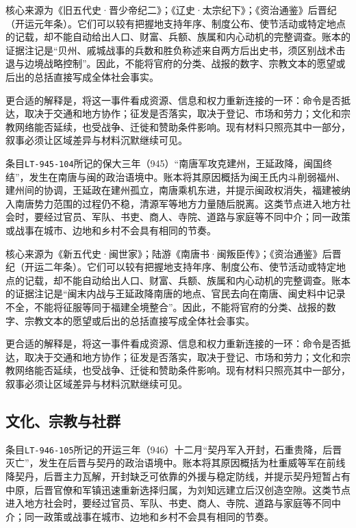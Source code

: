核心来源为《旧五代史·晋少帝纪二》；《辽史·太宗纪下》；《资治通鉴》后晋纪（开运元年条）。它们可以较有把握地支持年序、制度公布、使节活动或特定地点的记载，却不能自动给出人口、财富、兵额、族属和内心动机的完整调查。账本的证据注记是“贝州、戚城战事的兵数和胜负称述来自两方后出史书，须区别战术击退与边境战略控制”。因此，不能将官府的分类、战报的数字、宗教文本的愿望或后出的总括直接写成全体社会事实。

更合适的解释是，将这一事件看成资源、信息和权力重新连接的一环：命令是否抵达，取决于交通和地方协作；征发是否落实，取决于登记、市场和劳力；文化和宗教网络能否延续，也受战争、迁徙和赞助条件影响。现有材料只照亮其中一部分，叙事必须让区域差异与材料沉默继续可见。

条目\texttt{LT-945-104}所记的保大三年（945）“南唐军攻克建州，王延政降，闽国终结”，发生在南唐与闽的政治语境中。账本将其原因概括为闽王氏内斗削弱福州、建州间的协调，王延政在建州孤立，南唐乘机东进，并提示闽政权消失，福建被纳入南唐势力范围的过程仍不稳，清源军等地方力量随后脱离。这类节点进入地方社会时，要经过官员、军队、书吏、商人、寺院、道路与家庭等不同中介；同一政策或战事在城市、边地和乡村不会具有相同的节奏。

核心来源为《新五代史·闽世家》；陆游《南唐书·闽叛臣传》；《资治通鉴》后晋纪（开运二年条）。它们可以较有把握地支持年序、制度公布、使节活动或特定地点的记载，却不能自动给出人口、财富、兵额、族属和内心动机的完整调查。账本的证据注记是“闽末内战与王延政降南唐的地点、官民去向在南唐、闽史料中记录不全，不能将征服等同于福建全境整合”。因此，不能将官府的分类、战报的数字、宗教文本的愿望或后出的总括直接写成全体社会事实。

更合适的解释是，将这一事件看成资源、信息和权力重新连接的一环：命令是否抵达，取决于交通和地方协作；征发是否落实，取决于登记、市场和劳力；文化和宗教网络能否延续，也受战争、迁徙和赞助条件影响。现有材料只照亮其中一部分，叙事必须让区域差异与材料沉默继续可见。

\subsection{文化、宗教与社群}

条目\texttt{LT-946-105}所记的开运三年（946）十二月“契丹军入开封，石重贵降，后晋灭亡”，发生在后晋与契丹的政治语境中。账本将其原因概括为杜重威等军在前线降契丹，后晋主力瓦解，开封缺乏可依靠的外援与稳定防线，并提示契丹短暂占有中原，后晋官僚和军镇迅速重新选择归属，为刘知远建立后汉创造空隙。这类节点进入地方社会时，要经过官员、军队、书吏、商人、寺院、道路与家庭等不同中介；同一政策或战事在城市、边地和乡村不会具有相同的节奏。

